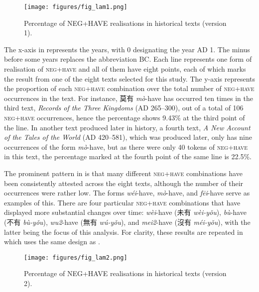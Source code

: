 \documentclass[output=paper,colorlinks,citecolor=brown,chinesefont]{langscibook}
\begin{document}
\begin{figure}
  \texttt{[image: figures/fig\_lam1.png]}
  \caption{Percentage of NEG+HAVE realisations in historical texts (version 1).}
  \label{fig:lam1}
\end{figure}

The x-axis in  represents the years, with 0 designating the year AD 1. The minus before some years replaces the abbreviation BC. Each line represents one form of realisation of \textsc{neg}+\textsc{have} and all of them have eight points, each of which marks the result from one of the eight texts selected for this study. The y-axis represents the proportion of each \textsc{neg}+\textsc{have} combination over the total number of \textsc{neg}+\textsc{have} occurrences in the text. For instance,
{\cn 莫有} \textit{mò}-have has occurred ten times in the third text, \emph{Records of the Three Kingdoms} (AD 265–300), out of a total of 106 \textsc{neg}+\textsc{have} occurrences, hence the percentage shows 9.43\% at the third point of the line. In another text produced later in history, a fourth text, \emph{A New Account of the Tales of the World} (AD 420–581), which was produced later, only has nine occurrences of the form \textit{mò}-have, but as there were only 40 tokens of \textsc{neg}+\textsc{have} in this text, the percentage marked at the fourth point of the same line is 22.5\%. \par 
The prominent pattern in  is that many different \textsc{neg}+\textsc{have} combinations have been consistently attested across the eight texts, although the number of their occurrences were rather low. The forms \textit{wéi}-have, \textit{mò}-have, and \textit{fēi}-have serve as examples of this. There are four particular \textsc{neg}+\textsc{have} combinations that have displayed more substantial changes over time: \textit{wèi}-have ({\cn 未有} \textit{wèi-yǒu}), \textit{bù}-have ({\cn 不有} \textit{bù-yǒu}), \textit{wu2}-have ({\cn 無有} \textit{wú-yǒu}), and \textit{mei2}-have ({\cn 沒有} \textit{méi-yǒu}), with the latter being the focus of this analysis. For clarity, these results are repeated in  which uses the same design as .


\begin{figure}
  \texttt{[image: figures/fig\_lam2.png]}
  \caption{Percentage of NEG+HAVE realisations in historical texts (version 2).}
  \label{fig:lam2}
\end{figure}
\end{document}

